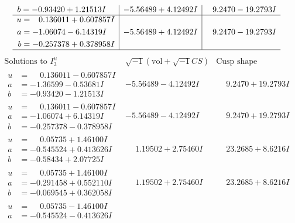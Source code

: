 \documentclass[1p]{elsarticle_modified}
\theoremstyle{definition}
\newcommand{\I}{\sqrt{-1}}
\begin{document}
$$\begin{array}{c|c|c}
\begin{aligned}
b &= -0.93420 + 1.21513 I\end{aligned}
 & -5.56489 + 4.12492 I & \phantom{-}9.2470 - 19.2793 I \\ \hline\begin{aligned}
u &= \phantom{-}0.136011 + 0.607857 I \\
a &= -1.06074 - 6.14319 I \\
b &= -0.257378 + 0.378958 I\end{aligned}
 & -5.56489 + 4.12492 I & \phantom{-}9.2470 - 19.2793 I\\
 \hline 
 \end{array}$$\newpage$$\begin{array}{c|c|c}  
\text{Solutions to }I^u_{3}& \I (\text{vol} + \sqrt{-1}CS) & \text{Cusp shape}\\
 \hline 
\begin{aligned}
u &= \phantom{-}0.136011 - 0.607857 I \\
a &= -1.36599 - 0.53681 I \\
b &= -0.93420 - 1.21513 I\end{aligned}
 & -5.56489 - 4.12492 I & \phantom{-}9.2470 + 19.2793 I \\ \hline\begin{aligned}
u &= \phantom{-}0.136011 - 0.607857 I \\
a &= -1.06074 + 6.14319 I \\
b &= -0.257378 - 0.378958 I\end{aligned}
 & -5.56489 - 4.12492 I & \phantom{-}9.2470 + 19.2793 I \\ \hline\begin{aligned}
u &= \phantom{-}0.05735 + 1.46100 I \\
a &= -0.545524 + 0.413626 I \\
b &= -0.58434 + 2.07725 I\end{aligned}
 & \phantom{-}1.19502 + 2.75460 I & \phantom{-}23.2685 + 8.6216 I \\ \hline\begin{aligned}
u &= \phantom{-}0.05735 + 1.46100 I \\
a &= -0.291458 + 0.552110 I \\
b &= -0.069545 + 0.362058 I\end{aligned}
 & \phantom{-}1.19502 + 2.75460 I & \phantom{-}23.2685 + 8.6216 I \\ \hline\begin{aligned}
u &= \phantom{-}0.05735 - 1.46100 I \\
a &= -0.545524 - 0.413626 I \\

\end{aligned}
\end{array}$$
\end{document}
